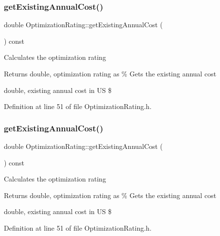 \subsubsection{\texorpdfstring{get\+Existing\+Annual\+Cost()}{getExistingAnnualCost()}\hspace{0.1cm}{\footnotesize\ttfamily [1/3]}}
{\footnotesize\ttfamily double Optimization\+Rating\+::get\+Existing\+Annual\+Cost (\begin{DoxyParamCaption}{ }\end{DoxyParamCaption}) const\hspace{0.3cm}{\ttfamily [inline]}}

Calculates the optimization rating

\begin{DoxyReturn}{Returns}
double, optimization rating as \% Gets the existing annual cost

double, existing annual cost in US \$ 
\end{DoxyReturn}


Definition at line 51 of file Optimization\+Rating.\+h.

\mbox{\label{class_optimization_rating_ac6e84aa94642911d089e464aae749ffe}} 
\subsubsection{\texorpdfstring{get\+Existing\+Annual\+Cost()}{getExistingAnnualCost()}\hspace{0.1cm}{\footnotesize\ttfamily [2/3]}}
{\footnotesize\ttfamily double Optimization\+Rating\+::get\+Existing\+Annual\+Cost (\begin{DoxyParamCaption}{ }\end{DoxyParamCaption}) const\hspace{0.3cm}{\ttfamily [inline]}}

Calculates the optimization rating

\begin{DoxyReturn}{Returns}
double, optimization rating as \% Gets the existing annual cost

double, existing annual cost in US \$ 
\end{DoxyReturn}


Definition at line 51 of file Optimization\+Rating.\+h.

